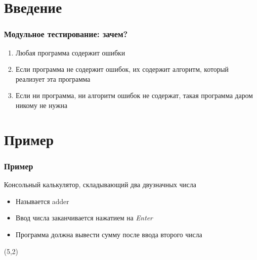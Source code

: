 \documentclass{../../slides-style}
\begin{document}
    
    \begin{frame}[plain]
        \titlepage
    \end{frame}

    \section{Введение}

    \begin{frame}
        \frametitle{Модульное тестирование: зачем?}
        \begin{enumerate}
            \item Любая программа содержит ошибки
            \item Если программа не содержит ошибок, их содержит алгоритм, который реализует эта программа
            \item Если ни программа, ни алгоритм ошибок не содержат, такая программа даром никому не нужна
        \end{enumerate}
    \end{frame}

    \section{Пример}

    \begin{frame}
        \frametitle{Пример}
        Консольный калькулятор, складывающий два двузначных числа
        \begin{itemize}
            \item Называется adder
            \item Ввод числа заканчивается нажатием на \textit{Enter}
            \item Программа должна вывести сумму после ввода второго числа
        \end{itemize}
        \begin{textblock}{5}(5,2)
        \end{textblock}
    \end{frame}
\end{document}

